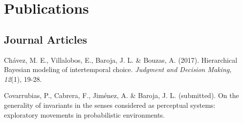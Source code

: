 \documentclass[letterpaper]{article}
\renewenvironment{itemize}{
  \begin{list}{}{
    \setlength{\leftmargin}{1.5em}
  }
}{
  \end{list}
}
\begin{document}
\section*{Publications} 

\subsection*{Journal Articles}
\begin{itemize}
\setlength\itemsep{-.25em}
\setlength{\itemindent}{-.125in}
	\item Chávez, M. E., Villalobos, E., Baroja, J. L. \& Bouzas, A. (2017). Hierarchical Bayesian modeling of intertemporal choice. \emph{Judgment and Decision Making, 12}(1), 19-28.
	\item Covarrubias, P., Cabrera, F., Jiménez, A. \& Baroja, J. L. (submitted). On the generality of invariants in the senses considered as perceptual systems: exploratory movements in probabilistic environments.
\end{itemize}
\end{document}
